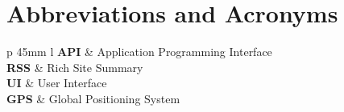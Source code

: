 \chapter*{Abbreviations and Acronyms}

\begin{tabular}{p {45mm} l }
\textbf{API}			&	Application Programming Interface			\\
\textbf{RSS}			&	Rich Site Summary							\\
\textbf{UI}				&	User Interface								\\
\textbf{GPS}			&	Global Positioning System					\\





\end{tabular}

\clearpage
